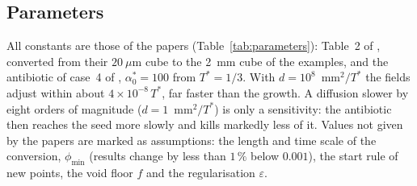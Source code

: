 \documentclass[11pt,a4paper]{article}
\begin{document}
\subsection{Parameters}
\label{sec:parameters}

All constants are those of the papers (Table~\ref{tab:parameters}): Table~2 of \citet{Klempt2024DiffusionDrivenGrowth}, converted from their $20~\mu$m cube to the 2~mm cube of the examples, and the antibiotic of case~4 of \citet{Klempt2026ContinuumBacterialGrowth}, $\alpha^*_0=100$ from $T^*=1/3$. With $d=10^8$~mm$^2/T^*$ the fields adjust within about $4\times10^{-8}\,T^*$, far faster than the growth. A diffusion slower by eight orders of magnitude ($d=1$~mm$^2/T^*$) is only a sensitivity: the antibiotic then reaches the seed more slowly and kills markedly less of it. Values not given by the papers are marked as assumptions: the length and time scale of the conversion, $\phi_{\min}$ (results change by less than $1\,\%$ below $0.001$), the start rule of new points, the void floor $f$ and the regularisation $\varepsilon$.
\end{document}
